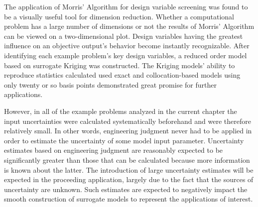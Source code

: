 The application of Morris' Algorithm for design variable screening was found to be a visually useful tool for dimension reduction. Whether a computational problem has a large number of dimensions or not the results of Morris' Algorithm can be viewed on a two-dimensional plot. Design variables having the greatest influence on an objective output's behavior become instantly recognizable. After identifying each example problem's key design variables, a reduced order model based on surrogate Kriging was constructed. The Kriging models' ability to reproduce statistics calculated used exact and collocation-based models using only twenty or so basis points demonstrated great promise for further applications.       

However, in all of the example problems analyzed in the current chapter the input uncertainties were calculated systematically beforehand and were therefore relatively small. In other words, engineering judgment never had to be applied in order to estimate the uncertainty of some model input parameter. Uncertainty estimates based on engineering judgment are reasonably expected to be significantly greater than those that can be calculated because more information is known about the latter. The introduction of large uncertainty estimates will be expected in the proceeding application, largely due to the fact that the sources of uncertainty are unknown. Such estimates are expected to negatively impact the smooth construction of surrogate models to represent the applications of interest.          


 

